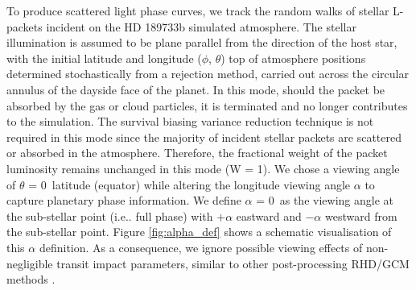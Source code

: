 \documentclass{aa}
\begin{document}
To produce scattered light phase curves, we track the random walks of stellar L-packets incident on the HD 189733b simulated atmosphere.
The stellar illumination is assumed to be plane parallel from the direction of the host star, with the initial latitude and longitude ($\phi$, $\theta$) top of atmosphere positions determined stochastically from a rejection method, carried out across the circular annulus of the dayside face of the planet.
In this mode, should the packet be absorbed by the gas or cloud particles, it is terminated and no longer contributes to the simulation.
The survival biasing variance reduction technique is not required in this mode since the majority of incident stellar packets are scattered or absorbed in the atmosphere.
Therefore, the fractional weight of the packet luminosity remains unchanged in this mode (W = 1).
We chose a viewing angle of $\theta$ = 0\degr\ latitude (equator) while altering the longitude viewing angle $\alpha$ to capture planetary phase information.
We define $\alpha$ = 0\degr\ as the viewing angle at the sub-stellar point (i.e.. full phase) with $+$\degr $\alpha$ eastward and $-$\degr  $\alpha$ westward  from the sub-stellar point.
Figure \ref{fig:alpha_def} shows a schematic visualisation of this $\alpha$ definition.
As a consequence, we ignore possible viewing effects of non-negligible transit impact parameters, similar to other post-processing RHD/GCM methods \citep[e.g.][]{Fortney2006,Showman2009,Amundsen2016}.
\end{document}
